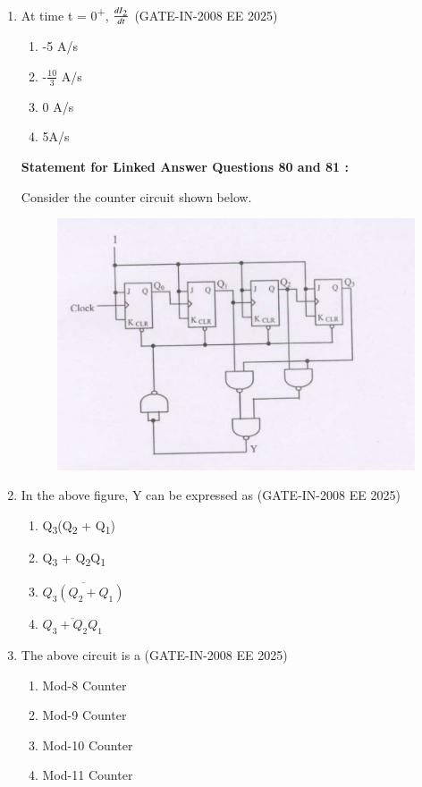 \documentclass[journal,12pt,onecolumn]{IEEEtran}
\theoremstyle{remark}
\begin{document}
\begin{enumerate}[label=Q.\arabic*,start=1]
\item At time t = 0\textsuperscript{+}, $\frac{dI\textsubscript{2}}{dt}$ (GATE-IN-2008 EE 2025)
           \begin{enumerate} 
              \item  -5 A/s       
              \item  -$\frac{10}{3}$ A/s 
              \item  0 A/s
              \item  5A/s
            \end{enumerate}

\textbf{Statement for Linked Answer Questions 80 and 81 :}

Consider the counter circuit shown below.
\begin{figure}[H]
    \centering
    \includegraphics[width=0.5\linewidth]{figs/i35.jpg}
    \label{fig:placeholder35}
\end{figure}

\item  In the above figure, Y can be expressed as (GATE-IN-2008 EE 2025)
           \begin{enumerate} 
              \item  Q\textsubscript{3}(Q\textsubscript{2} + Q\textsubscript{1})        
              \item  Q\textsubscript{3} + Q\textsubscript{2}Q\textsubscript{1}
              \item  $\overline{Q_3(Q_2 +{Q_1})}$ \
              \item $\overline{Q_3 + Q_2  Q_1}$ \
            \end{enumerate}


\item The above circuit is a (GATE-IN-2008 EE 2025)
           \begin{enumerate} 
              \item  Mod-8 Counter           
              \item  Mod-9 Counter
              \item  Mod-10 Counter
              \item  Mod-11 Counter
            \end{enumerate}


\end{enumerate}
\end{document}
